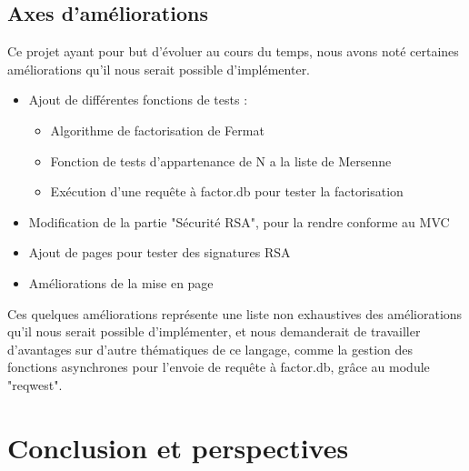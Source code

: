 \documentclass[12pt]{article} %
\begin{document}
	
	\subsection{Axes d'améliorations}

		Ce projet ayant pour but d'évoluer au cours du temps, nous avons noté certaines améliorations qu'il nous serait possible d'implémenter. 
		
		\begin{itemize}
			\item Ajout de différentes fonctions de tests :
			\begin{itemize}
				\item Algorithme de factorisation de Fermat
				\item Fonction de tests d'appartenance de N a la liste de Mersenne
				\item Exécution d'une requête à factor.db pour tester la factorisation
			\end{itemize}			
			\item Modification de la partie "Sécurité RSA", pour la rendre conforme au MVC
			\item Ajout de pages pour tester des signatures RSA
			\item Améliorations de la mise en page	
		\end{itemize}
	
		Ces quelques améliorations représente une liste non exhaustives des améliorations qu'il nous serait possible d'implémenter, et nous demanderait de travailler d'avantages sur d'autre thématiques de ce langage, comme la gestion des fonctions asynchrones pour l'envoie de requête à factor.db, grâce au module "reqwest".




























\newpage

\section{Conclusion et perspectives}
\end{document}
